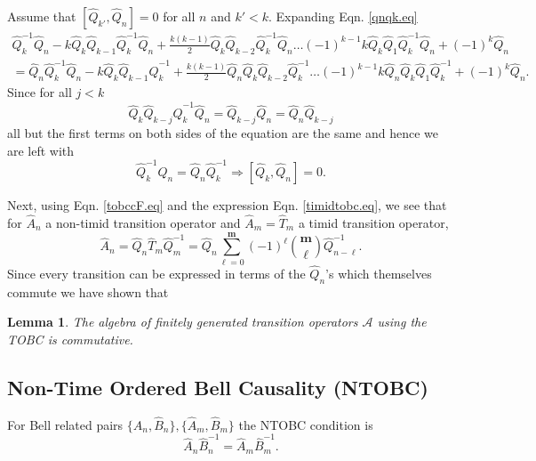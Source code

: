 \documentclass[11pt]{article}
\newtheorem{lemma}[theorem]{Lemma}
\newcommand{\hA}{\hat { A}}
\newcommand{\hQ}{\hat Q}
\newcommand{\hB}{\hat B}
\newcommand{\bmm}{{\mathbf m}}
\newcommand{\h}{\hat}
\begin{document}
Assume that $[\hQ_{k'}, \hQ_n]=0$ for all $n$ and  $k'<k$.   Expanding
Eqn. \eqref{qnqk.eq} 
\begin{eqnarray}
 \hQ_k^{-1} \hQ_n - k  \hQ_k \hQ_{k-1} \hQ_{k}^{-1} \hQ_n +
  \frac{k(k-1)}{2} \hQ_k \hQ_{k-2} \hQ_{k}^{-1} \hQ_n \ldots
  (-1)^{k-1} k  \hQ_k \hQ_{1} \hQ_{k}^{-1} \hQ_n + (-1)^k \hQ_n
  \nonumber \\ = \hQ_n \hQ_k^{-1} \hQ_n - k  \hQ_k \hQ_{k-1} \hQ_{k}^{-1} +
  \frac{k(k-1)}{2} \hQ_n\hQ_k \hQ_{k-2} \hQ_{k}^{-1} \ldots
  (-1)^{k-1} k  \hQ_n\hQ_k \hQ_{1} \hQ_{k}^{-1}+ (-1)^k \hQ_n.
\end{eqnarray}
Since for all $j<k$
\begin{equation}
  \hQ_k \hQ_{k-j} \hQ_{k}^{-1} \hQ_n = \hQ_{k-j}  \hQ_n =\hQ_n  \hQ_{k-j}  
\end{equation}  
all but the first terms on both sides of the equation are the same and
hence we are left with 
\begin{equation}
  \hQ_k^{-1} \hQ_n= \hQ_n \hQ_k^{-1} \Rightarrow [\hQ_k, \hQ_n]=0. 
\end{equation} 

Next, using Eqn. \eqref{tobccF.eq} and the expression
Eqn. \eqref{timidtobc.eq},  we see that for $\hA_n$ a non-timid transition
operator and  $\hA_m=\h T_m$ a timid transition operator,  
\begin{equation}
  \hA_n=\hQ_n\h T_m\hQ_m^{-1} = \hQ_n \sum_{\ell=0}^\bmm (-1)^\ell \binom{\bmm}{\ell}
  \hQ_{n-\ell}^{-1}. 
\end{equation} 
Since every   transition  can be expressed in terms of the $\hQ_n$'s
which themselves commute we have shown that 

\begin{lemma}
The algebra of finitely generated transition operators $\mathcal{A}$
using the TOBC is commutative. 
\end{lemma}





 \subsection{Non-Time Ordered Bell Causality (NTOBC)}  
 \label{ntobc.ssec}
 
For Bell related pairs $\{\hA_n, \hB_n \}, \{\hA_m, \hB_m \}$ the
NTOBC condition is 
\begin{equation}
\hA_n \hB_n^{-1}=\hA_m\hB_m^{-1}. 
\end{equation}
\end{document}
